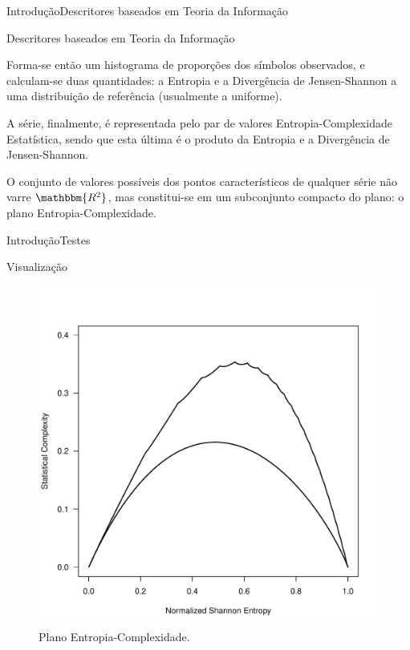 \documentclass[10pt,xcolor={dvipsnames}]{beamer}
\begin{document}
\begin{frame}{Introdução}{Descritores baseados em Teoria da Informação}
\begin{block}{Descritores baseados em Teoria da Informação}
	\pause
	
Forma-se então um histograma de proporções dos símbolos observados, e calculam-se duas quantidades: a Entropia e a Divergência de Jensen-Shannon a uma distribuição de referência (usualmente a uniforme).

	\pause
A série, finalmente, é representada pelo par de valores Entropia-Complexidade Estatística, sendo que esta última é o produto da Entropia e a Divergência de Jensen-Shannon.

	\pause
O conjunto de valores possíveis dos pontos característicos de qualquer série não varre $\mathbbm{R^2}$, mas constitui-se em um subconjunto compacto do plano: o plano Entropia-Complexidade.
\end{block}
\end{frame}

\begin{frame}{Introdução}{Testes}
\begin{block}{Visualização}
	\begin{figure}[hbt]
		\centering
		\includegraphics[width=.4\linewidth]{plano_HC}
		\caption{Plano Entropia-Complexidade.}\label{fig:Plano_HC}
	\end{figure}
\end{block}
\end{frame}
\end{document}
